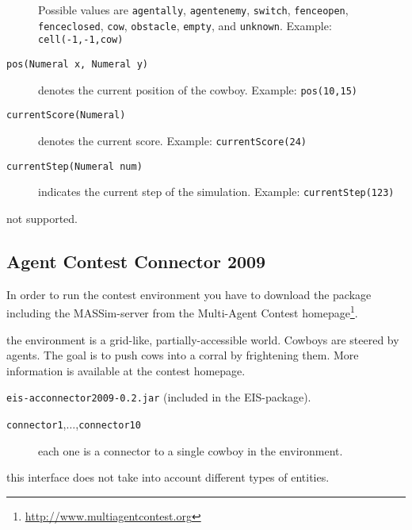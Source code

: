 \documentclass[a4]{article}
\newcommand{\EIS}{\textsf{EIS}\xspace}
\begin{document}
\begin{description}
Possible values are \texttt{agentally}, \texttt{agentenemy}, \texttt{switch}, \texttt{fenceopen}, 
\texttt{fenceclosed}, \texttt{cow}, \texttt{obstacle}, \texttt{empty}, and \texttt{unknown}. 
Example: \texttt{cell(-1,-1,cow)}
\item[\texttt{pos(Numeral x, Numeral y)}] denotes the current position of the cowboy. Example: \texttt{pos(10,15)}
\item[\texttt{currentScore(Numeral)}] denotes the current score. Example: \texttt{currentScore(24)}
\item[\texttt{currentStep(Numeral num)}] indicates the current step of the simulation.
Example: \texttt{currentStep(123)}
\end{description}

 not supported.

\subsection{Agent Contest Connector 2009}

In order to run the contest environment you have to download the package including the MASSim-server from
the Multi-Agent Contest homepage\footnote{\url{http://www.multiagentcontest.org}}. 

\medskip{} the environment is a grid-like, partially-accessible world. Cowboys are steered
by agents. The goal is to push cows into a corral by frightening them. More information is available at the 
contest homepage.

\medskip{} \texttt{eis-acconnector2009-0.2.jar} (included in the \EIS-package).

\medskip{}
\begin{description}
\item[\texttt{connector1},$\ldots$,\texttt{connector10}] each one is a connector to a single cowboy in the environment.
\end{description}

 this interface does not take into account different types of entities.
\end{document}
